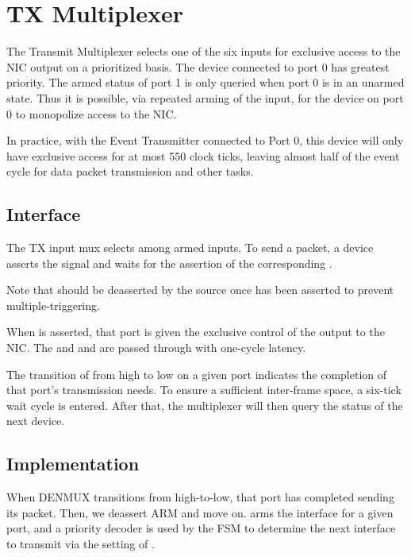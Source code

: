 
\section{TX Multiplexer}
The Transmit Multiplexer selects one of the six inputs for exclusive
access to the NIC output on a prioritized basis. The device connected
to port 0 has greatest priority. The armed status of port 1 is only
queried when port 0 is in an unarmed state. Thus it is possible, via
repeated arming of the input, for the device on port 0 to monopolize
access to the NIC.

In practice, with the Event Transmitter connected to Port 0, this
device will only have exclusive access for at most 550 clock ticks,
leaving almost half of the event cycle for data packet transmission
and other tasks.

\subsection{Interface}
The TX input mux selects among armed inputs. To send a packet, a
device asserts the  signal and waits for the assertion of
the corresponding .

Note that  should be deasserted by the source once
 has been asserted to prevent multiple-triggering.

When  is asserted, that port is given the exclusive
control of the output to the NIC. The  and and
 are passed through with one-cycle latency.

The transition of  from high to low on a given port
indicates the completion of that port's transmission needs. To ensure a sufficient inter-frame space, a six-tick wait cycle is entered. After that, the
multiplexer will then query the  status of the next device.


\subsection{Implementation}

When DENMUX transitions from high-to-low, that port has completed
sending its packet. Then, we deassert ARM and move on. 
arms the interface for a given port, and a priority decoder is used by
the FSM to determine the next interface to transmit via the setting of
.

